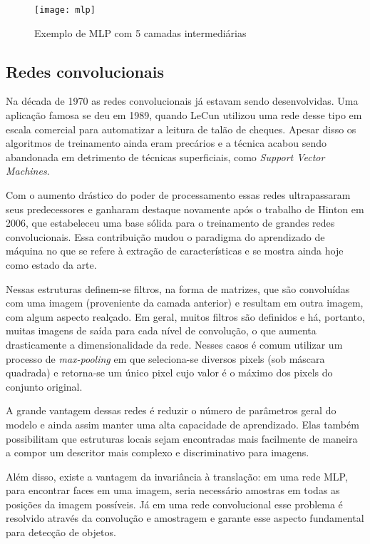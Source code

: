 \begin{figure}[h]
\caption{Exemplo de MLP com 5 camadas intermediárias}
\centering
\texttt{[image: mlp]}
\label{fig:mlp}
\end{figure}

\subsection{Redes convolucionais}
Na década de 1970 as redes convolucionais já estavam sendo desenvolvidas. Uma aplicação famosa se deu em 1989, quando LeCun utilizou uma rede desse tipo em escala comercial para automatizar a leitura de talão de cheques. Apesar disso os algoritmos de treinamento ainda eram precários e a técnica acabou sendo abandonada em detrimento de técnicas superficiais, como \textit{Support Vector Machines}.

Com o aumento drástico do poder de processamento essas redes ultrapassaram seus predecessores e ganharam destaque novamente após o trabalho de Hinton \cite{hintonDL} em 2006, que estabeleceu uma base sólida para o treinamento de grandes redes convolucionais. Essa contribuição mudou o paradigma do aprendizado de máquina no que se refere à extração de características e se mostra ainda hoje como estado da arte. 

Nessas estruturas definem-se filtros, na forma de matrizes, que são convoluídas com uma imagem (proveniente da camada anterior) e resultam em outra imagem, com algum aspecto realçado. Em geral, muitos filtros são definidos e há, portanto, muitas imagens de saída para cada nível de convolução, o que aumenta drasticamente a dimensionalidade da rede. Nesses casos é comum utilizar um processo de \textit{max-pooling} em que seleciona-se diversos pixels (sob máscara quadrada) e retorna-se um único pixel cujo valor é o máximo dos pixels do conjunto original.

A grande vantagem dessas redes é reduzir o número de parâmetros geral do modelo e ainda assim manter uma alta capacidade de aprendizado. Elas também possibilitam que estruturas locais sejam encontradas mais facilmente de maneira a compor um descritor mais complexo e discriminativo para imagens.

Além disso, existe a vantagem da invariância à translação: em uma rede MLP, para encontrar faces em uma imagem, seria necessário amostras em todas as posições da imagem possíveis. Já em uma rede convolucional esse problema é resolvido através da convolução e amostragem e garante esse aspecto fundamental para detecção de objetos.

